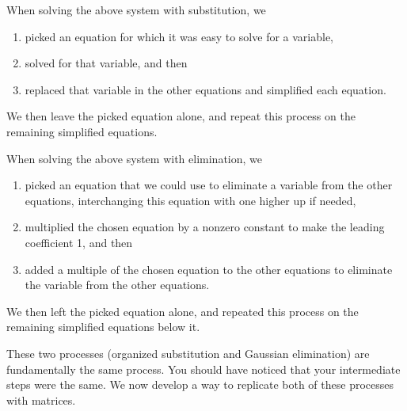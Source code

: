 


\begin{observation}
 
When solving the above system with substitution, we 
\begin{enumerate}
 \item 
picked an equation for which it was easy to solve for a variable, 
 \item
solved for that variable, and then 
\item
replaced that variable in the other equations and simplified each equation. 
\end{enumerate}
We then leave the picked equation alone, and repeat this process on the remaining simplified equations. 

When solving the above system with elimination, we 
\begin{enumerate}
 \item 
picked an equation that we could use to eliminate a variable from the other equations, interchanging this equation with one higher up if needed, 
 \item
multiplied the chosen equation by a nonzero constant to make the leading coefficient 1, and then 
 \item 
added a multiple of the chosen equation to the other equations to eliminate the variable from the other equations. 
\end{enumerate}
We then left the picked equation alone, and repeated this process on the remaining simplified equations below it. 
\end{observation}

These two processes (organized substitution and Gaussian elimination) are fundamentally the same process. You should have noticed that your intermediate steps were the same. We now develop a way to replicate both of these processes with matrices.

